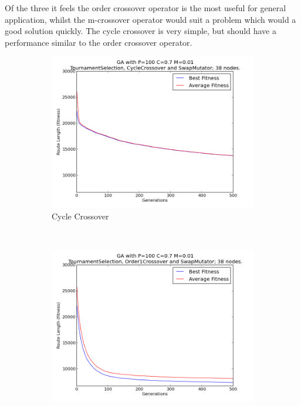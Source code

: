 \documentclass[10pt, a4paper]{article}
\begin{document}
Of the three it feels the order crossover operator is the most useful for
general application, whilst the m-crossover operator would suit a problem which
would a good solution quickly. The cycle crossover is very simple, but should
have a performance similar to the order crossover operator.


\begin{figure}[h]
\centering

\begin{subfigure}[b]{0.67\textwidth}
\includegraphics[width=\textwidth]{img/results/cyclecrossover/swapmutator/n38p100c07m001}
\caption{Cycle Crossover}
\end{subfigure}
~
\begin{subfigure}[b]{0.67\textwidth}
\includegraphics[width=\textwidth]{img/results/order1crossover/swapmutator/n38p100c07m001}

\end{subfigure}
\end{figure}
\end{document}
